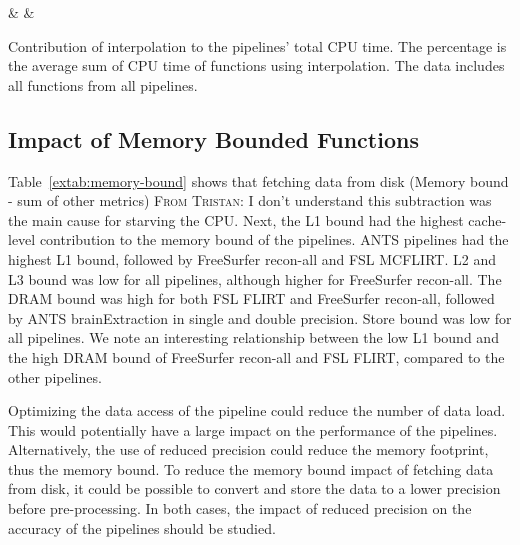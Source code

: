 \documentclass[conference]{IEEEtran}
\newcommand{\TG}[1]{\color{blue}\textsc{From Tristan: }#1\color{black}}
\begin{document}
\begin{table}[ht]
	\centering
	{\pipeline & \nfunc & \tablenum[round-precision=2]{\cputime}}
	\caption{Contribution of interpolation to the pipelines' total CPU time. The percentage is the average sum of CPU time of functions using interpolation. The data includes all functions from all pipelines.}
	\label{extab:interpolation}
\end{table}



\subsection{Impact of Memory Bounded Functions}
Table~\ref{extab:memory-bound} shows that fetching data from disk (Memory bound - sum of other metrics) \TG{I don't understand this subtraction} was the main cause for starving the CPU. Next, the L1 bound had the highest cache-level contribution to the memory bound of the pipelines. ANTS pipelines had the highest L1 bound, followed by FreeSurfer recon-all and FSL MCFLIRT. L2 and L3 bound was low for all pipelines, although higher for FreeSurfer recon-all. The DRAM bound was high for both FSL FLIRT and FreeSurfer recon-all, followed by ANTS brainExtraction in single and double precision. Store bound was low for all pipelines. We note an interesting relationship between the low L1 bound and the high DRAM bound of FreeSurfer recon-all and FSL FLIRT, compared to the other pipelines.

Optimizing the data access of the pipeline could reduce the number of data load. This would potentially have a large impact on the performance of the pipelines. Alternatively, the use of reduced precision could reduce the memory footprint, thus the memory bound. To reduce the memory bound impact of fetching data from disk, it could be possible to convert and store the data to a lower precision before pre-processing. In both cases, the impact of reduced precision on the accuracy of the pipelines should be studied.
			
\end{document}
